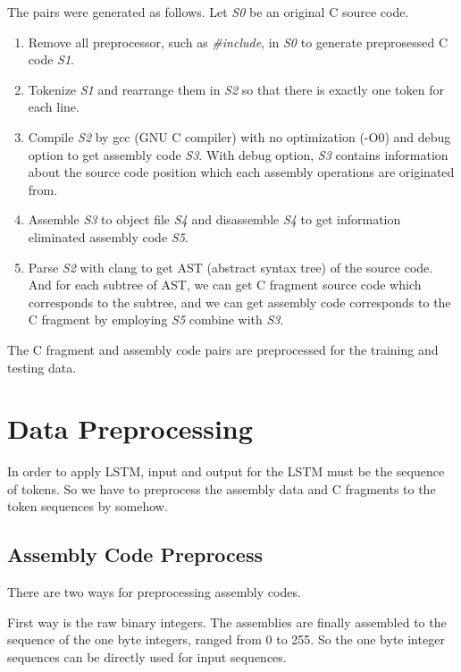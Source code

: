 \documentclass[senior,final,11pt]{iscs-thesis}
\begin{document}
The pairs were generated as follows. Let {\sl S0} be an original C source code.
\begin{enumerate}
\item Remove all preprocessor, such as {\sl \#include}, in {\sl S0} to generate preprosessed C code {\sl S1}. 
\item Tokenize {\sl S1} and rearrange them in {\sl S2} so that there is exactly one token for each line. 
\item 
Compile {\sl S2} by gcc (GNU C compiler) with no optimization (-O0) and debug option to get assembly code {\sl S3}. 
With debug option, {\sl S3} contains information about the source code position which each assembly operations are originated from.
\item Assemble {\sl S3} to object file {\sl S4} and disassemble {\sl S4} to get information eliminated assembly code {\sl S5}.
\item 
Parse {\sl S2} with clang to get AST (abstract syntax tree) of the source code. 
And for each subtree of AST, we can get C fragment source code which corresponds to the subtree, 
and we can get assembly code corresponds to the C fragment by employing {\sl S5} combine with {\sl S3}.
\end{enumerate}

The C fragment and assembly code pairs are preprocessed for the training and testing data.


\section{Data Preprocessing}

In order to apply LSTM, input and output for the LSTM must be the sequence of tokens. 
So we have to preprocess the assembly data and C fragments to the token sequences by somehow.

\subsection{Assembly Code Preprocess}
There are two ways for preprocessing assembly codes.

First way is the raw binary integers. The assemblies are finally assembled to the sequence of the one byte integers, ranged from 0 to 255.
So the one byte integer sequences can be directly used for input sequences.
\end{document}
